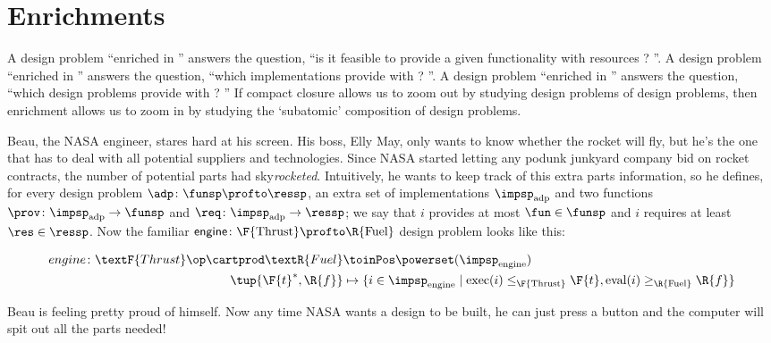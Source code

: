 
\section{Enrichments}
\label{sec:enriched}


A design problem ``enriched in \Bool'' answers the question, ``is it feasible to provide a given functionality \fun with resources \res?
''.
A design problem ``enriched in \Set'' answers the question, ``which implementations provide \fun with \res?
''.
A design problem ``enriched in \DP'' answers the question, ``which design problems provide \fun with \res?
'' If compact closure allows us to zoom out by studying design problems of design problems, then enrichment allows us to zoom in by studying the `subatomic' composition of design problems.

\begin{example}
    \label{ex:dpi_example}
    Beau, the NASA engineer, stares hard at his screen.
    His boss, Elly May, only wants to know whether the rocket will fly, but he's the one that has to deal with all potential suppliers and technologies.
    Since NASA started letting any podunk junkyard company bid on rocket contracts, the number of potential parts had sky\emph{rocketed}.
    Intuitively, he wants to keep track of this extra parts information, so he defines, for every design problem $\adp \colon \funsp \profto \ressp$, an extra set of implementations $\impsp_\text{adp}$ and two functions $\prov\colon \impsp_\text{adp} \to \funsp$ and  $\req\colon \impsp_\text{adp} \to \ressp$; we say that $i$ provides at most $\fun \in \funsp$ and $i$ requires at least $\res \in \ressp$.
    Now the familiar $\mathsf{engine} \colon \F{\text{Thrust}} \profto \R{\text{Fuel}}$ design problem looks like this:
    \begin{widepar}
        \begin{equation*}
            \begin{aligned}
                engine \colon \textF{Thrust}\op \cartprod \textR{Fuel} & \toinPos \powerset(\impsp_\text{engine})                                                                                             \\
                \tup{\F{t}^*,\R{f}}                                    & \mapsto \{ i \in \impsp_\text{engine} \mid \text{exec}(i) \leq_\F{\text{Thrust}} \F{t}, \text{eval}(i) \geq_\R{\text{Fuel}} \R{f} \}
            \end{aligned}
        \end{equation*}
    \end{widepar}
    Beau is feeling pretty proud of himself.
    Now any time NASA wants a design to be built, he can just press a button and the computer will spit out all the parts needed!
\end{example}

